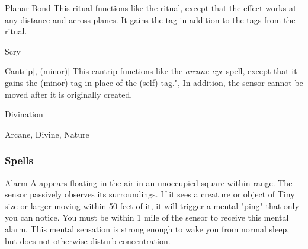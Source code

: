 \lowercase{\hypertarget{spell:Planar Bond}{}}\label{spell:Planar Bond}
\begin{ability}[\nth{7}]{\hypertarget{spell:Planar Bond}{Planar Bond}}
This ritual functions like the  ritual, except that the effect works at any distance and across planes.
It gains the  tag in addition to the tags from the  ritual.
\end{ability}
\vspace{0.25em}


\newpage
\begin{spellsection}{Scry}

\begin{spellheader}
\end{spellheader}


\begin{ability}{Cantrip}[,  (minor)]
This cantrip functions like the \textit{arcane eye} spell, except that it gains the  (minor) tag in place of the  (self) tag.",
In addition, the sensor cannot be moved after it is originally created.
\end{ability}




 Divination

 Arcane, Divine, Nature
\end{spellsection}


\subsubsection{Spells}


\lowercase{\hypertarget{spell:Alarm}{}}\label{spell:Alarm}
\begin{ability}[\nth{1}]{\hypertarget{spell:Alarm}{Alarm}}
A  appears floating in the air in an unoccupied square within \rngmed range.
The sensor passively observes its surroundings.
If it sees a creature or object of Tiny size or larger moving within 50 feet of it, it will trigger a mental "ping" that only you can notice.
You must be within 1 mile of the sensor to receive this mental alarm.
This mental sensation is strong enough to wake you from normal sleep, but does not otherwise disturb concentration.
\end{ability}
\vspace{0.25em}



